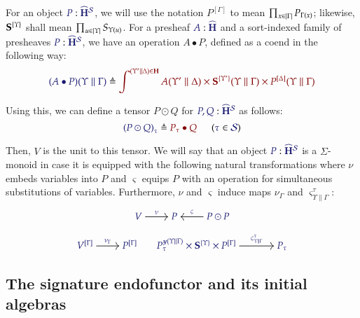 \documentclass[11pt]{article}
\theoremstyle{definition}
\theoremstyle{remark}
\numberwithin{equation}{section}
\newcommand\HypCat{\mathbf{H}}
\begin{document}
For an object $\Of{P}{\widehat{\HypCat}^\Sorts}$, we will use the notation
$P^{[\Gamma]}$ to mean $\prod_{x\in\left\vert\Gamma\right\vert}P_{\Gamma(x)}$; likewise,
$\mathbf{S}^{\{\Upsilon\}}$ shall mean $\prod_{u\in\left\vert\Upsilon\right\vert}S_{\Upsilon(u)}$. For a
presheaf $\Of{A}{\widehat{\HypCat}}$ and a sort-indexed family of presheaves
$\Of{P}{\widehat{\HypCat}^\Sorts}$, we have an operation $A\bullet P$, defined
as a coend in the following way:
\[
  \Define{(A\bullet P)(\Upsilon\parallel\Gamma)}{
    \int^{(\Upsilon'\parallel\Delta)\in\HypCat}
      A(\Upsilon'\parallel\Delta)
      \times \SymPsh^{\{\Upsilon'\}}(\Upsilon\parallel\Gamma)
      \times P^{[\Delta]}(\Upsilon\parallel\Gamma)
  }
\]

Using this, we can define a tensor $P\odot Q$ for
$\Of{P,Q}{\widehat{\HypCat}^\Sorts}$ as follows:
\[
  \HypJ{
    \Define{{(P\odot Q)}_{\tau}}{
      P_\tau\bullet Q
    }
\quad
  }{
    \Member{\tau}{\Sorts}
  }
\]

Then, $V$ is the unit to this tensor. We will say that an object
$\Of{P}{\widehat{\HypCat}^\Sorts}$ is a $\Sigma$-monoid in case it is equipped
with the following natural transformations where $\nu$ embeds variables into $P$
and $\varsigma$ equips $P$ with an operation for simultaneous substitutions of
variables. Furthermore, $\nu$ and $\varsigma$ induce maps ${\nu}_{\Gamma}$ and
${\varsigma}^{\tau}_{\Upsilon\parallel\Gamma}$:
\begin{gather*}
  \begin{tikzcd}[cramped, ampersand replacement = \&]
    {\IMode{V}} \arrow[r, "\IMode\nu"]
    \&
    {\IMode{P}}
    \&
    {\IMode{P\odot P}}
      \arrow[l, swap, "\IMode\varsigma"]
  \end{tikzcd}\\[6pt]
  \begin{tikzcd}[cramped, ampersand replacement = \&]
    {\IMode{{V}^{[\Gamma]}}}
      \arrow[r, "\IMode{{\nu}_{\Gamma}}"]
    \&
    {\IMode{{P}^{[\Gamma]}}}
  \end{tikzcd}
  \qquad
  \begin{tikzcd}[cramped, sep = large, ampersand replacement = \&]
    {\IMode{{P_\tau^{\Yoneda{\Upsilon\parallel\Gamma}}\times \SymPsh^{\{\Upsilon\}}\times P^{[\Gamma]}}}}
      \arrow[r, "\IMode{\varsigma^\tau_{\Upsilon\parallel\Gamma}}"]
    \&
    {\IMode{P_\tau}}
  \end{tikzcd}
\end{gather*}

\subsection{The signature endofunctor and its initial algebras}
\end{document}
